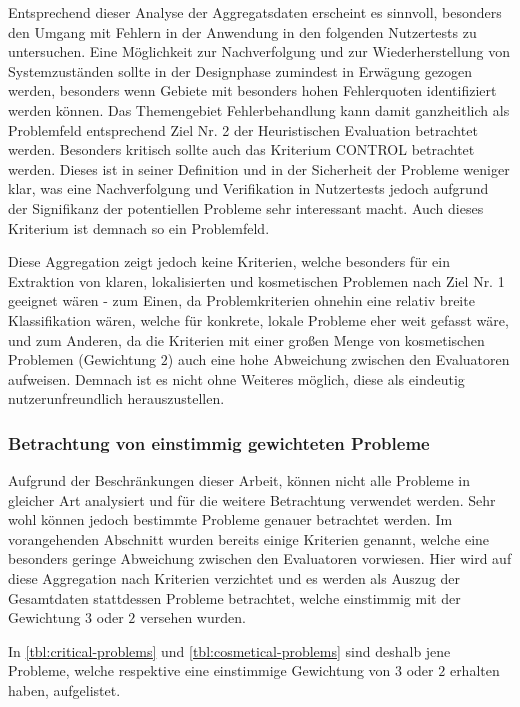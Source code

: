 \documentclass[
  12pt,
  ngerman,
  a4paper,
]{article}
\begin{document}
Entsprechend dieser Analyse der Aggregatsdaten erscheint es sinnvoll,
besonders den Umgang mit Fehlern in der Anwendung in den folgenden
Nutzertests zu untersuchen. Eine Möglichkeit zur Nachverfolgung und zur
Wiederherstellung von Systemzuständen sollte in der Designphase
zumindest in Erwägung gezogen werden, besonders wenn Gebiete mit
besonders hohen Fehlerquoten identifiziert werden können. Das
Themengebiet Fehlerbehandlung kann damit ganzheitlich als Problemfeld
entsprechend Ziel Nr. 2 der Heuristischen Evaluation betrachtet werden.
Besonders kritisch sollte auch das Kriterium CONTROL betrachtet werden.
Dieses ist in seiner Definition und in der Sicherheit der Probleme
weniger klar, was eine Nachverfolgung und Verifikation in Nutzertests
jedoch aufgrund der Signifikanz der potentiellen Probleme sehr
interessant macht. Auch dieses Kriterium ist demnach so ein Problemfeld.

Diese Aggregation zeigt jedoch keine Kriterien, welche besonders für ein
Extraktion von klaren, lokalisierten und kosmetischen Problemen nach
Ziel Nr. 1 geeignet wären - zum Einen, da Problemkriterien ohnehin eine
relativ breite Klassifikation wären, welche für konkrete, lokale
Probleme eher weit gefasst wäre, und zum Anderen, da die Kriterien mit
einer großen Menge von kosmetischen Problemen (Gewichtung \(2\)) auch
eine hohe Abweichung zwischen den Evaluatoren aufweisen. Demnach ist es
nicht ohne Weiteres möglich, diese als eindeutig nutzerunfreundlich
herauszustellen.

\hypertarget{betrachtung-von-einstimmig-gewichteten-probleme}{%
\subsubsection{Betrachtung von einstimmig gewichteten
Probleme}\label{betrachtung-von-einstimmig-gewichteten-probleme}}

Aufgrund der Beschränkungen dieser Arbeit, können nicht alle Probleme in
gleicher Art analysiert und für die weitere Betrachtung verwendet
werden. Sehr wohl können jedoch bestimmte Probleme genauer betrachtet
werden. Im vorangehenden Abschnitt wurden bereits einige Kriterien
genannt, welche eine besonders geringe Abweichung zwischen den
Evaluatoren vorwiesen. Hier wird auf diese Aggregation nach Kriterien
verzichtet und es werden als Auszug der Gesamtdaten stattdessen Probleme
betrachtet, welche einstimmig mit der Gewichtung \(3\) oder \(2\)
versehen wurden.

In \cref{tbl:critical-problems} und \cref{tbl:cosmetical-problems} sind
deshalb jene Probleme, welche respektive eine einstimmige Gewichtung von
\(3\) oder \(2\) erhalten haben, aufgelistet.
\end{document}
